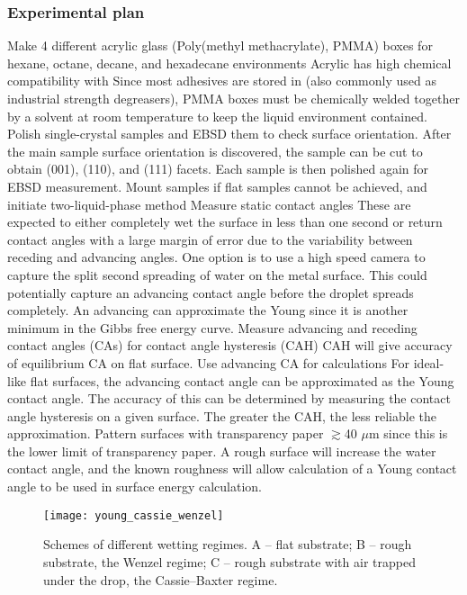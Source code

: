 \subsubsection{Experimental plan}
\begin{outline}[enumerate]
\1 Make 4 different acrylic glass (Poly(methyl methacrylate), PMMA) boxes for hexane, octane, decane, and hexadecane environments
	\2 Acrylic has high chemical compatibility with \nalk[s] \cite{Thermoscientific}		
	\2 Since most adhesives are stored in \nalk[s] (also commonly used as industrial strength degreasers), PMMA boxes must be chemically welded together by a solvent at room temperature to keep the liquid environment contained. 
\1 Polish single-crystal samples and EBSD them to check surface orientation. After the main sample surface orientation is discovered, the sample can be cut to obtain \hkl(001), \hkl(110), and \hkl(111) facets. Each sample is then polished again for EBSD measurement. 
\1 Mount samples if flat samples cannot be achieved, and initiate two-liquid-phase method
	\2 Measure static contact angles
		\3 These are expected to either completely wet the surface in less than one second or return contact angles with a large margin of error due to the variability between receding and advancing angles. 
		\3 One option is to use a high speed camera to capture the split second spreading of water on the metal surface. This could potentially capture an advancing contact angle before the droplet spreads completely. An advancing \ca can approximate the Young \ca since it is another minimum in the Gibbs free energy curve.
	\2 Measure advancing and receding contact angles (CAs) for contact angle hysteresis (CAH)
		\3 CAH will give accuracy of equilibrium CA on flat surface. 
	\2 Use advancing CA for calculations
		\3 For ideal-like flat surfaces, the advancing contact angle can be approximated as the Young contact angle. The accuracy of this can be determined by measuring the contact angle hysteresis on a given surface. The greater the CAH, the less reliable the approximation. 
\1 Pattern surfaces with transparency paper $\gtrsim$40 $\mu$m since this is the lower limit of transparency paper. A rough surface will increase the water contact angle, and the known roughness will allow calculation of a Young contact angle to be used in surface energy calculation. 

\begin{figure}[h]
	\centering
		\texttt{[image: young\_cassie\_wenzel]}
	\caption{Schemes of different wetting regimes. A – flat substrate; B – rough substrate, the Wenzel regime; C – rough substrate with air trapped under the drop, the Cassie–Baxter regime.\cite{Whyman2008}}
	\label{fig:young_cassie_wenzel}
\end{figure}


\end{outline}
